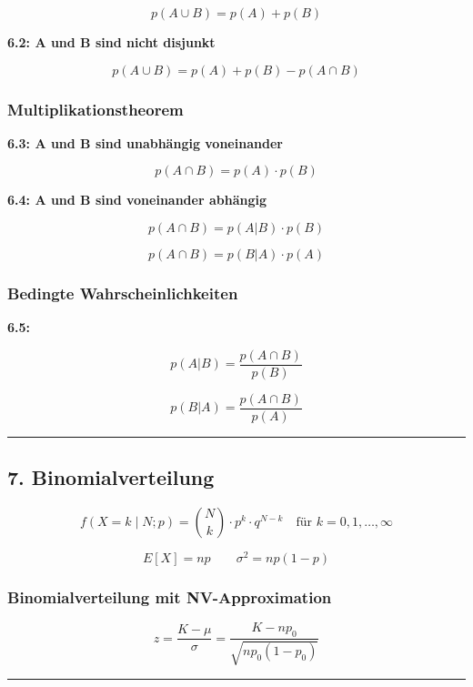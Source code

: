 \documentclass[
]{article}
\begin{document}
\[p(A \cup B) = p(A) + p(B)\]

\textbf{6.2: A und B sind nicht disjunkt}

\[p(A \cup B) = p(A) + p(B) - p(A \cap B)\]

\subsubsection{Multiplikationstheorem}\label{multiplikationstheorem}

\textbf{6.3: A und B sind unabhängig voneinander}

\[p(A \cap B) = p(A) \cdot p(B)\]

\textbf{6.4: A und B sind voneinander abhängig}

\[p(A \cap B) = p(A|B) \cdot p(B)\]

\[p(A \cap B) = p(B|A) \cdot p(A)\]

\subsubsection{Bedingte
Wahrscheinlichkeiten}\label{bedingte-wahrscheinlichkeiten}

\textbf{6.5:}

\[p(A|B) = \frac{p(A \cap B)}{p(B)}\]

\[p(B|A) = \frac{p(A \cap B)}{p(A)}\]

\begin{center}\rule{0.5\linewidth}{0.5pt}\end{center}

\subsection{7. Binomialverteilung}\label{binomialverteilung}

\[f(X = k \mid N; p) = \binom{N}{k} \cdot p^k \cdot q^{N-k} \quad \text{für } k = 0, 1, \dots, \infty\]

\[E[X] = np \qquad \sigma^2 = np(1-p)\]

\subsubsection{Binomialverteilung mit
NV-Approximation}\label{binomialverteilung-mit-nv-approximation}

\[z = \frac{K - \mu}{\sigma} = \frac{K - np_0}{\sqrt{np_0(1 - p_0)}}\]

\begin{center}\rule{0.5\linewidth}{0.5pt}\end{center}
\end{document}
